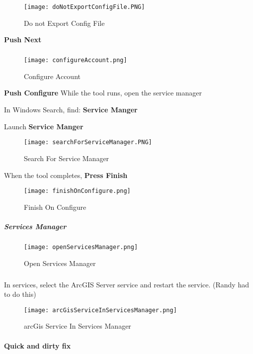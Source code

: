 \documentclass[class=book , crop=false, titlepage, twoside, multi={itemize, figure, verbatim}, float=false]{standalone}
\begin{document}
\begin{figure}[h!]
\centering
\texttt{[image: doNotExportConfigFile.PNG]}
\caption{Do not Export Config File}
\end{figure}
\noindent\textbf{\Large Push Next}
\subparagraph*{}
\begin{figure}[h!]
\centering
\texttt{[image: configureAccount.png]}
\caption{Configure Account}
\end{figure}
\noindent\textbf{\Large Push Configure}
\clearpage
\noindent While the tool runs, open the service manager
\vspace{.2in}

\noindent In Windows Search, find: \textbf{Service Manger}
\vspace{.2in}

\noindent Launch \textbf{Service Manger}
\begin{figure}[h!]
\centering
\texttt{[image: searchForServiceManager.PNG]}
\caption{Search For Service Manager}
\end{figure}
\vspace{.2in}

\noindent When the tool completes, \textbf{\Large Press Finish}
\begin{figure}[h!]
\centering
\texttt{[image: finishOnConfigure.png]}
\caption{Finish On Configure}
\end{figure}
\clearpage
\subparagraph*{Services Manager}
\begin{figure}[h!]
\centering
\texttt{[image: openServicesManager.png]}
\caption{Open Services Manager}
\end{figure}
\subparagraph*{}
\noindent In services, select the ArcGIS Server service and restart the service.  (Randy had to do this)\\

\begin{figure}[h!]
\centering
\texttt{[image: arcGisServiceInServicesManager.png]}
\caption{arcGis Service In Services Manager}
\end{figure}


\clearpage


\paragraph*{Quick and dirty fix\texorpdfstring{\\}{}}
\end{document}
